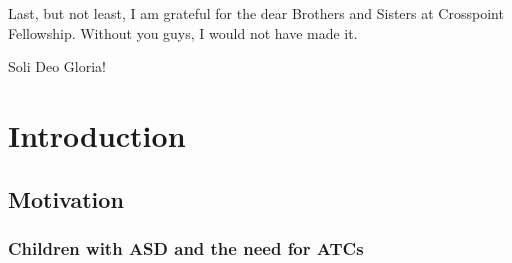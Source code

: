 \documentclass{ut-thesis}
\providecommand{\DIFaddbegin}{} %
\providecommand{\DIFaddend}{} %
\begin{document}
\begin{preliminary}
Last, but not least, I am grateful for the dear Brothers and Sisters at Crosspoint Fellowship.  Without you guys, I would not have made it.
\DIFaddbegin 

\DIFaddend Soli Deo Gloria!


\listoffigures
\listoftables


\tableofcontents




\end{preliminary}





\chapter{Introduction}


\section{Motivation}

\subsection{Children with ASD and the need for ATCs}
\end{document}

